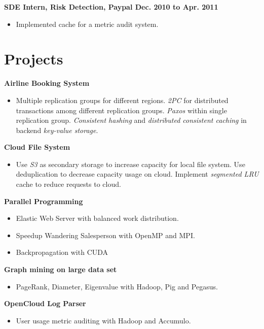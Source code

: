 \documentclass[]{res}
\begin{document}
\begin{resume}
{\bf SDE Intern, Risk Detection, Paypal \hfill  Dec. 2010 to Apr. 2011}
\begin{itemize} \itemsep -2pt %
\item Implemented cache for a metric audit system.
\end{itemize}

\section{Projects}
{\bf Airline Booking System  \hfill }
\begin{itemize} \itemsep -2pt %
\item Multiple replication groups for different regions. \textit{2PC} for distributed 
transactions among different replication groups. \textit{Paxos} within single replication group.
\textit{Consistent hashing} and \textit{distributed consistent caching} in backend \textit{key-value storage}.
\end{itemize}

{\bf Cloud File System  \hfill }
\begin{itemize} \itemsep -2pt %
\item Use \textit{S3} as secondary storage to increase capacity for local file system. Use 
deduplication to decrease capacity usage on cloud. Implement \textit{segmented
LRU} cache to reduce requests to cloud.
\end{itemize}

{\bf Parallel Programming  \hfill }
\begin{itemize} \itemsep -2pt %
\item Elastic Web Server with balanced work distribution.
\item Speedup Wandering Salesperson with OpenMP and MPI.
\item Backpropagation with CUDA
\end{itemize}

{\bf Graph mining on large data set  \hfill }
\begin{itemize} \itemsep -2pt %
\item PageRank, Diameter, Eigenvalue with Hadoop, Pig and Pegasus.
\end{itemize}

{\bf OpenCloud Log Parser  \hfill }
\begin{itemize} \itemsep -2pt %
\item User usage metric auditing with Hadoop and Accumulo.
\end{itemize}

\end{resume}
\end{document}

